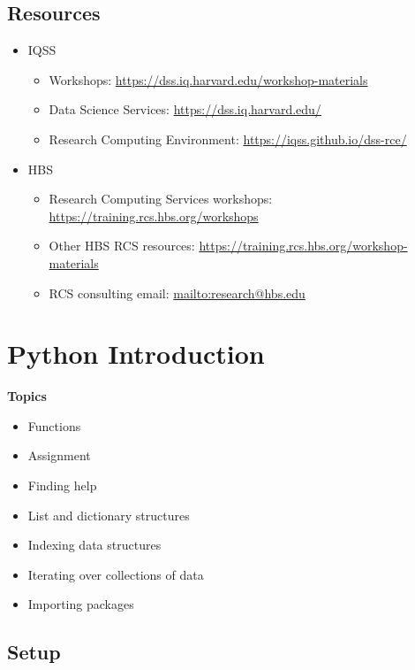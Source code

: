 \documentclass[
]{book}
\providecommand{\tightlist}{%
  \setlength{\itemsep}{0pt}\setlength{\parskip}{0pt}}
\begin{document}
\hypertarget{resources-6}{%
\section{Resources}\label{resources-6}}

\begin{itemize}
\tightlist
\item
  IQSS

  \begin{itemize}
  \tightlist
  \item
    Workshops: \url{https://dss.iq.harvard.edu/workshop-materials}
  \item
    Data Science Services: \url{https://dss.iq.harvard.edu/}
  \item
    Research Computing Environment: \url{https://iqss.github.io/dss-rce/}
  \end{itemize}
\item
  HBS

  \begin{itemize}
  \tightlist
  \item
    Research Computing Services workshops: \url{https://training.rcs.hbs.org/workshops}
  \item
    Other HBS RCS resources: \url{https://training.rcs.hbs.org/workshop-materials}
  \item
    RCS consulting email: \url{mailto:research@hbs.edu}
  \end{itemize}
\end{itemize}

\hypertarget{python-introduction}{%
\chapter{Python Introduction}\label{python-introduction}}

\textbf{Topics}

\begin{itemize}
\tightlist
\item
  Functions
\item
  Assignment
\item
  Finding help
\item
  List and dictionary structures
\item
  Indexing data structures
\item
  Iterating over collections of data
\item
  Importing packages
\end{itemize}

\hypertarget{setup-4}{%
\section{Setup}\label{setup-4}}
\end{document}
